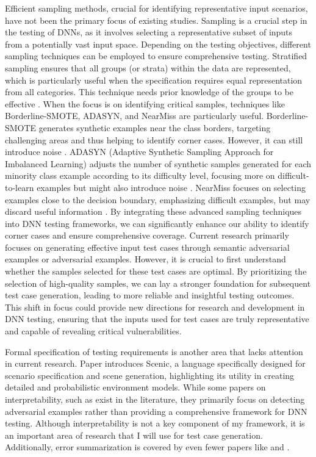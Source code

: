 Efficient sampling methods, crucial for identifying representative input scenarios, have not been the primary focus of existing studies. Sampling is a crucial step in the testing of DNNs, as it involves selecting a representative subset of inputs from a potentially vast input space. Depending on the testing objectives, different sampling techniques can be employed to ensure comprehensive testing. Stratified sampling ensures that all groups (or strata) within the data are represented, which is particularly useful when the specification requires equal representation from all categories. This technique needs prior knowledge of the groups to be effective \cite{Stratifiedsampling}. When the focus is on identifying critical samples, techniques like Borderline-SMOTE, ADASYN, and NearMiss are particularly useful. Borderline-SMOTE generates synthetic examples near the class borders, targeting challenging areas and thus helping to identify corner cases. However, it can still introduce noise \cite{Han2005}. ADASYN (Adaptive Synthetic Sampling Approach for Imbalanced Learning) adjusts the number of synthetic samples generated for each minority class example according to its difficulty level, focusing more on difficult-to-learn examples but might also introduce noise \cite{He2008}. NearMiss focuses on selecting examples close to the decision boundary, emphasizing difficult examples, but may discard useful information \cite{near-miss}. By integrating these advanced sampling techniques into DNN testing frameworks, we can significantly enhance our ability to identify corner cases and ensure comprehensive coverage. Current research primarily focuses on generating effective input test cases through semantic adversarial examples or adversarial examples. However, it is crucial to first understand whether the samples selected for these test cases are optimal. By prioritizing the selection of high-quality samples, we can lay a stronger foundation for subsequent test case generation, leading to more reliable and insightful testing outcomes. This shift in focus could provide new directions for research and development in DNN testing, ensuring that the inputs used for test cases are truly representative and capable of revealing critical vulnerabilities.

Formal specification of testing requirements is another area that lacks attention in current research. Paper \cite{Scenic} introduces Scenic, a language specifically designed for scenario specification and scene generation, highlighting its utility in creating detailed and probabilistic environment models. While some papers on interpretability, such as \cite{Fidel, Lin, Walker, Rahnama, Watson, Kuppa} exist in the literature, they primarily focus on detecting adversarial examples rather than providing a comprehensive framework for DNN testing. Although interpretability is not a key component of my framework, it is an important area of research that I will use for test case generation. Additionally, error summarization is covered by even fewer papers like \cite{ChenJ} and \cite{Deepmutation}.

